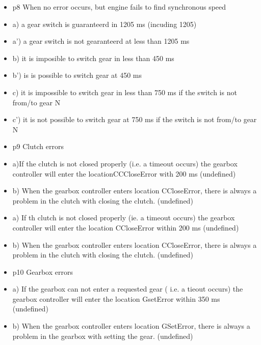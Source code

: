 \begin{itemize}
 
\item  p8 When no error occurs, but engine fails to find synchronous speed
\item  a) a gear switch is guaranteerd in 1205 ms (incuding 1205)
\item  a') a gear switch is not gearanteerd at less than 1205 ms
\item  b) it is imposible to switch gear in less than 450 ms
\item  b') is is possible to switch gear at 450 ms
\item  c) it is impossible to switch gear in less than 750 ms if the switch is not from/to gear N
\item  c') it is not possible to switch gear at 750 ms if the switch is not from/to gear N
 
 
\item  p9 Clutch errors
\item  a)If the clutch is not closed properly (i.e. a timeout occurs) the gearbox  controller will enter the locationCCCloseError with 200 ms   (undefined)
\item  b)  When the gearbox controller enters location CCloseError, there is always a problem in the clutch with closing the clutch.  (undefined)
\item  a) If th clutch is not closed properly (ie. a timeout occurs) the gearbox controller will enter the location CCloseError within 200 ms (undefined)
\item  b) When the gearbox controller enters location CCloseError, there is always a problem in the clutch with closing the clutch. (undefined)
 
 
\item  p10 Gearbox errors  
\item  a) If the gearbox can not enter a requested gear ( i.e. a tieout occurs) the gearbox controller will enter the location GsetError within 350 ms (undefined)
\item  b) When the gearbox controller enters location GSetError, there is always a problem in the gearbox with setting the gear. (undefined)
 

\end{itemize}
